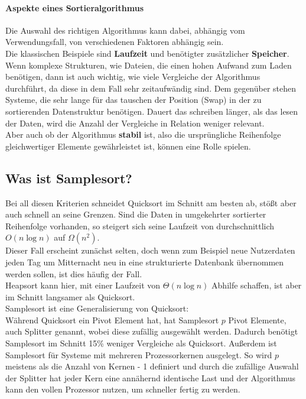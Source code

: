 		\paragraph{Aspekte eines Sortieralgorithmus}
			Die Auswahl des richtigen Algorithmus kann dabei, abhängig vom Verwendungsfall, von verschiedenen Faktoren abhängig sein.\\
			Die klassischen Beispiele sind \textbf{Laufzeit} und benötigter zusätzlicher \textbf{Speicher}.
			Wenn komplexe Strukturen, wie Dateien, die einen hohen Aufwand zum Laden benötigen, dann ist auch wichtig, wie viele Vergleiche der Algorithmus durchführt, da diese in dem Fall sehr zeitaufwändig sind.
			Dem gegenüber stehen Systeme, die sehr lange für das tauschen der Position (Swap) in der zu sortierenden Datenstruktur benötigen.
			Dauert das schreiben länger, als das lesen der Daten, wird die Anzahl der Vergleiche in Relation weniger relevant.\\
			Aber auch ob der Algorithmus \textbf{stabil} ist, also die ursprüngliche Reihenfolge gleichwertiger Elemente gewährleistet ist, können eine Rolle spielen.\\
			

    \subsection{Was ist Samplesort?}
    	Bei all diesen Kriterien schneidet Quicksort im Schnitt am besten ab, stößt aber auch schnell an seine Grenzen. Sind die Daten in umgekehrter sortierter Reihenfolge vorhanden, so steigert sich seine Laufzeit von durchschnittlich $O(n\log{n})$ auf $\Omega(n^2)$.\\
    	Dieser Fall erscheint zunächst selten, doch wenn zum Beispiel neue Nutzerdaten jeden Tag um Mitternacht neu in eine strukturierte Datenbank übernommen werden sollen, ist dies häufig der Fall.\\
    	Heapsort kann hier, mit einer Laufzeit von $\Theta(n\log{n})$ Abhilfe schaffen, ist aber im Schnitt langsamer als Quicksort.\\
    	Samplesort ist eine Generalisierung von Quicksort:\\
    	Während Quicksort ein Pivot Element hat, hat Samplesort $p$ Pivot Elemente, auch Splitter genannt, wobei diese zufällig ausgewählt werden.
    	Dadurch benötigt Samplesort im Schnitt 15\% weniger Vergleiche als Quicksort. \autocite{frazer-1970}
    	Außerdem ist Samplesort für Systeme mit mehreren Prozessorkernen ausgelegt.
    	So wird $p$ meistens als die Anzahl von Kernen - 1 definiert und durch die zufällige Auswahl der Splitter hat jeder Kern eine annähernd identische Last und der Algorithmus kann den vollen Prozessor nutzen, um schneller fertig zu werden.
    
